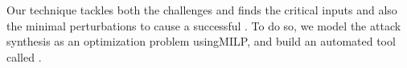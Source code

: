 

Our technique tackles both the challenges and finds the critical inputs and also the minimal perturbations to cause a successful \attack. To do so, we model the attack synthesis as an optimization problem using\ac{MILP}, and build an automated tool called \tool. %

